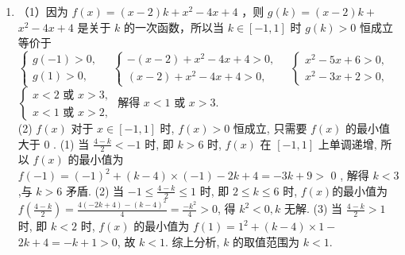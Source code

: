 \documentclass[10pt]{article}
\begin{document}
\begin{enumerate}
  \item （1）因为 $f(x)=(x-2) k+x^{2}-4 x+4$ ，则 $g(k)=(x-2) k+$ $x^{2}-4 x+4$ 是关于 $k$ 的一次函数，所以当 $k \in[-1,1]$ 时 $g(k)>0$ 恒成立等价于 $\left\{\begin{array}{l}g(-1)>0, \\ g(1)>0,\end{array} \quad\left\{\begin{array}{l}-(x-2)+x^{2}-4 x+4>0, \\ (x-2)+x^{2}-4 x+4>0,\end{array} \quad\left\{\begin{array}{l}x^{2}-5 x+6>0, \\ x^{2}-3 x+2>0,\end{array}\right.\right.\right.$\\
$\left\{\begin{array}{l}x<2 \text { 或 } x>3, \\ x<1 \text { 或 } x>2,\end{array}\right.$ 解得 $x<1$ 或 $x>3$.\\
(2) $f(x)$ 对于 $x \in[-1,1]$ 时, $f(x)>0$ 恒成立, 只需要 $f(x)$ 的最小值大于 0 . (1) 当 $\frac{4-k}{2}<-1$ 时, 即 $k>6$ 时, $f(x)$ 在 $[-1,1]$ 上单调递增, 所以 $f(x)$ 的最小值为 $f(-1)=(-1)^{2}+(k-4) \times(-1)-2 k+4=-3 k+9>$ 0 , 解得 $k<3$,与 $k>6$ 矛盾. (2) 当 $-1 \leqslant \frac{4-k}{2} \leqslant 1$ 时, 即 $2 \leqslant k \leqslant 6$ 时, $f(x)$的最小值为 $f\left(\frac{4-k}{2}\right)=\frac{4(-2 k+4)-(k-4)^{2}}{4}=\frac{-k^{2}}{4}>0$, 得 $k^{2}<0, k$ 无解. (3) 当 $\frac{4-k}{2}>1$ 时, 即 $k<2$ 时, $f(x)$ 的最小值为 $f(1)=1^{2}+(k-4) \times 1-$ $2 k+4=-k+1>0$, 故 $k<1$. 综上分析, $k$ 的取值范围为 $k<1$.
\end{enumerate}
\end{document}
